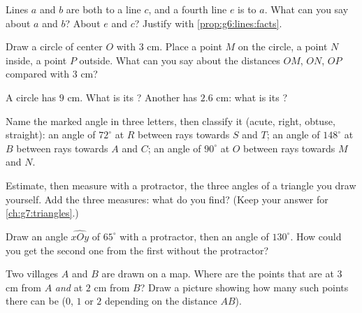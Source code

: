 \begin{exercise}[$\star$]\label{exo:g6:lines:4}
Lines $a$ and $b$ are both  to a line $c$, and a fourth
line $e$ is  to $a$. What can you say about $a$ and $b$?
About $e$ and $c$? Justify with \cref{prop:g6:lines:facts}.
\end{exercise}

\begin{exercise}[$\star$]\label{exo:g6:lines:5}
Draw a circle of center $O$ with  $3$ cm. Place a point $M$ on
the circle, a point $N$ inside, a point $P$ outside. What can you say
about the distances $OM$, $ON$, $OP$ compared with $3$ cm?
\end{exercise}

\begin{exercise}[$\star$]\label{exo:g6:lines:6}
A circle has  $9$ cm. What is its ? Another has 
$2.6$ cm: what is its ?
\end{exercise}

\begin{exercise}[$\star$]\label{exo:g6:lines:7}
Name the marked angle in three letters, then classify it (acute, right,
obtuse, straight): an angle of $72^\circ$ at  $R$ between rays
towards $S$ and $T$; an angle of $148^\circ$ at  $B$ between rays
towards $A$ and $C$; an angle of $90^\circ$ at  $O$ between rays
towards $M$ and $N$.
\end{exercise}

\begin{exercise}[$\star$]\label{exo:g6:lines:8}
Estimate, then measure with a protractor, the three angles of a
triangle you draw yourself. Add the three measures: what do you find?
(Keep your answer for \cref{ch:g7:triangles}.)
\end{exercise}

\begin{exercise}[$\star$]\label{exo:g6:lines:9}
Draw an angle $\widehat{xOy}$ of $65^\circ$ with a protractor, then an
angle of $130^\circ$. How could you get the second one from the first
without the protractor?
\end{exercise}

\begin{exercise}[$\star\star$]\label{exo:g6:lines:10}
Two villages $A$ and $B$ are drawn on a map. Where are the points that
are at $3$ cm from $A$ \emph{and} at $2$ cm from $B$? Draw a picture
showing how many such points there can be ($0$, $1$ or $2$ depending on
the distance $AB$).
\end{exercise}

